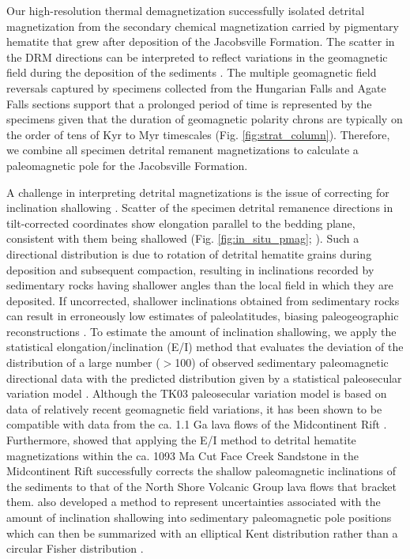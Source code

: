 \documentclass[draft]{agujournal2019}
\begin{document}
Our high-resolution thermal demagnetization successfully isolated detrital magnetization from the secondary chemical magnetization carried by pigmentary hematite that grew after deposition of the Jacobsville Formation. The scatter in the DRM directions can be interpreted to reflect variations in the geomagnetic field during the deposition of the sediments \cite{Steiner1983a, Tauxe1984a}. The multiple geomagnetic field reversals captured by specimens collected from the Hungarian Falls and Agate Falls sections support that a prolonged period of time is represented by the specimens given that the duration of geomagnetic polarity chrons are typically on the order of tens of Kyr to Myr timescales (Fig. \ref{fig:strat_column}). Therefore, we combine all specimen detrital remanent magnetizations to calculate a paleomagnetic pole for the Jacobsville Formation.  

A challenge in interpreting detrital magnetizations is the issue of correcting for inclination shallowing \cite{King1955a, Tauxe2004b, Bilardello2016b}. Scatter of the specimen detrital remanence directions in tilt-corrected coordinates show elongation parallel to the bedding plane, consistent with them being shallowed (Fig. \ref{fig:in_situ_pmag}; ). Such a directional distribution is due to rotation of detrital hematite grains during deposition and subsequent compaction, resulting in inclinations recorded by sedimentary rocks having shallower angles than the local field in which they are deposited. If uncorrected, shallower inclinations obtained from sedimentary rocks can result in erroneously low estimates of paleolatitudes, biasing paleogeographic reconstructions \cite{Muttoni2003a, Domeier2012a}. To estimate the amount of inclination shallowing, we apply the statistical elongation/inclination (E/I) method that evaluates the deviation of the distribution of a large number ($>$100) of observed sedimentary paleomagnetic directional data with the predicted distribution given by a statistical paleosecular variation model \cite{Tauxe2004b}. Although the TK03 paleosecular variation model is based on data of relatively recent geomagnetic field variations, it has been shown to be compatible with data from the ca. 1.1 Ga lava flows of the Midcontinent Rift \cite{Tauxe2009a}. Furthermore,  showed that applying the E/I method to detrital hematite magnetizations within the ca. 1093 Ma Cut Face Creek Sandstone in the Midcontinent Rift successfully corrects the shallow paleomagnetic inclinations of the sediments to that of the North Shore Volcanic Group lava flows that bracket them.  also developed a method to represent uncertainties associated with the amount of inclination shallowing into sedimentary paleomagnetic pole positions which can then be summarized with an elliptical Kent distribution \cite{Kent1982a} rather than a circular Fisher distribution \cite{Fisher1953a}. 
\end{document}
